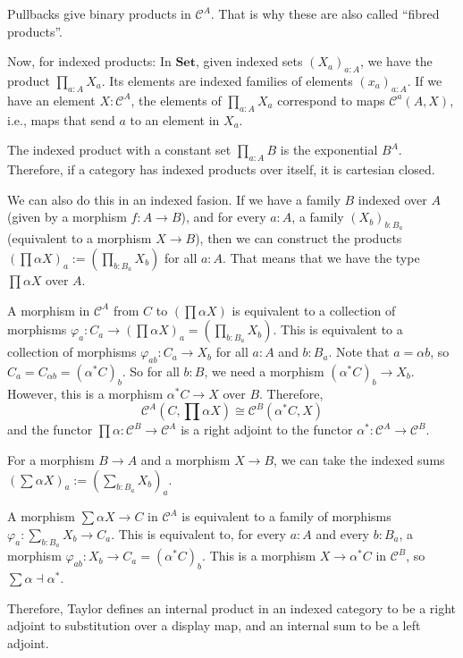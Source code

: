 \documentclass{amsbook}
\newcommand{\Catc}[1]{\mathcal{#1}}
\newcommand{\CC}{\Catc{C}}
\newcommand{\Catb}[1]{\mathbf{#1}}
\newcommand{\SET}{\Catb{Set}}
\newcommand{\Hom}[3]{{#1}\left(#2,#3\right)}
\theoremstyle{definition}
\begin{document}
  Pullbacks give binary products in $ \CC^A $. That is why these are also called ``fibred products''.

  Now, for indexed products: In $ \SET $, given indexed sets $ (X_a)_{a : A} $, we have the product $ \prod_{a: A} X_a $. Its elements are indexed families of elements $ (x_a)_{a: A} $. If we have an element $ X: \CC^A $, the elements of $ \prod_{a : A} X_a $ correspond to maps $ \Hom{\CC^a}{A}{X} $, i.e., maps that send $ a $ to an element in $ X_a $.

  The indexed product with a constant set $ \prod_{a: A} B $ is the exponential $ B^A $. Therefore, if a category has indexed products over itself, it is cartesian closed.

  We can also do this in an indexed fasion. If we have a family $ B $ indexed over $ A $ (given by a morphism $ f: A \to B $), and for every $ a: A $, a family $ (X_b)_{b : B_a} $ (equivalent to a morphism $ X \to B $), then we can construct the products $ (\prod \alpha X)_a := (\prod_{b: B_a} X_b) $ for all $ a : A $. That means that we have the type $ \prod \alpha X $ over $ A $.

  A morphism in $ \CC^A $ from $ C $ to $ (\prod \alpha X) $ is equivalent to a collection of morphisms $ \varphi_a: C_a \to (\prod \alpha X)_a = (\prod_{b: B_a} X_b) $.
  This is equivalent to a collection of morphisms $ \varphi_{ab}: C_a \to X_b $ for all $ a: A $ and $ b: B_a $.
  Note that $ a = \alpha b $, so $ C_a = C_{\alpha b} = (\alpha^* C)_b $.
  So for all $ b: B $, we need a morphism $ (\alpha^* C)_b \to X_b $. However, this is a morphism $ \alpha^* C \to X $ over $ B $.
  Therefore,
  \[ \Hom{\CC^A}{C}{\prod \alpha X} \cong \Hom{\CC^B}{\alpha^* C}{X} \]
  and the functor $ \prod \alpha: \CC^B \to \CC^A $ is a right adjoint to the functor $ \alpha^*: \CC^A \to \CC^B $.

  For a morphism $ B \to A $ and a morphism $ X \to B $, we can take the indexed sums $ (\sum \alpha X)_a := (\sum_{b: B_a} X_b)_a $.

  A morphism $ \sum \alpha X \to C $ in $ \CC^A $ is equivalent to a family of morphisms $ \varphi_a: \sum_{b: B_a} X_b \to C_a $.
  This is equivalent to, for every $ a: A $ and every $ b: B_a $, a morphism $ \varphi_{ab}: X_b \to C_a = (\alpha^* C)_b $.
  This is a morphism $ X \to \alpha^* C $ in $ \CC^B $, so $ \sum \alpha \dashv \alpha^* $.

  Therefore, Taylor defines an internal product in an indexed category to be a right adjoint to substitution over a display map, and an internal sum to be a left adjoint.
\end{document}
